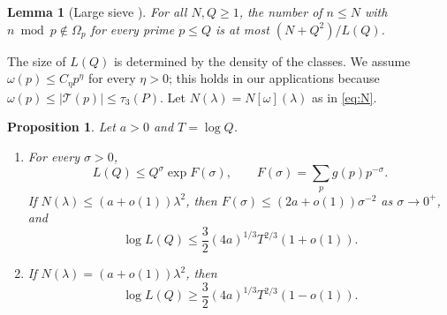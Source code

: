 \documentclass[aps,prd,twocolumn,superscriptaddress,nofootinbib,longbibliography,floatfix,showkeys,nobalancelastpage,amsmath,amssymb,10pt]{revtex4-2}
\theoremstyle{plain}
\newtheorem{proposition}[theorem]{Proposition}
\newtheorem{lemma}[theorem]{Lemma}
\theoremstyle{definition}
\theoremstyle{plain}
\newcommand{\Tp}{\mathcal{T}}
\begin{document}
\begin{lemma}[Large sieve \cite{Mon,MV}]\label{lem:ls}
For all $N,Q\ge1$, the number of $n\le N$ with $n\bmod p\notin\Omega_p$ for every prime $p\le Q$ is at most $(N+Q^2)/L(Q)$.
\end{lemma}

The size of $L(Q)$ is determined by the density of the classes. We assume $\omega(p)\le C_\eta p^\eta$ for every $\eta>0$; this holds in our applications because $\omega(p)\le|\Tp(p)|\le\tau_3(P)$. Let $N(\lambda)=N[\omega](\lambda)$ as in \eqref{eq:N}.

\begin{proposition}\label{prop:tilt}
Let $a>0$ and $T=\log Q$.
\begin{enumerate}
\item[(i)] For every $\sigma>0$,
\begin{equation}\label{eq:rankin}
L(Q)\le Q^\sigma\exp F(\sigma),\qquad F(\sigma)=\sum_pg(p)p^{-\sigma}.
\end{equation}
If $N(\lambda)\le(a+o(1))\lambda^2$, then $F(\sigma)\le(2a+o(1))\sigma^{-2}$ as $\sigma\to0^+$, and
\[
\log L(Q)\le\frac32(4a)^{1/3}T^{2/3}(1+o(1)).
\]
\item[(ii)] If $N(\lambda)=(a+o(1))\lambda^2$, then
\[
\log L(Q)\ge\frac32(4a)^{1/3}T^{2/3}(1-o(1)).
\]
\end{enumerate}
\end{proposition}
\end{document}
